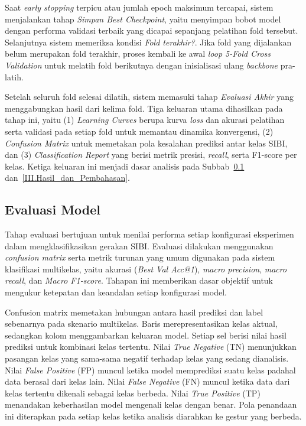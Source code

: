 Saat \textit{early stopping} terpicu atau jumlah epoch maksimum tercapai, sistem menjalankan tahap \textit{Simpan Best Checkpoint}, yaitu menyimpan bobot model dengan performa validasi terbaik yang dicapai sepanjang pelatihan fold tersebut. Selanjutnya sistem memeriksa kondisi \textit{Fold terakhir?}. Jika fold yang dijalankan belum merupakan fold terakhir, proses kembali ke awal \textit{loop 5-Fold Cross Validation} untuk melatih fold berikutnya dengan inisialisasi ulang \textit{backbone} pra-latih.

Setelah seluruh fold selesai dilatih, sistem memasuki tahap \textit{Evaluasi Akhir} yang menggabungkan hasil dari kelima fold. Tiga keluaran utama dihasilkan pada tahap ini, yaitu (1) \textit{Learning Curves} berupa kurva \textit{loss} dan akurasi pelatihan serta validasi pada setiap fold untuk memantau dinamika konvergensi, (2) \textit{Confusion Matrix} untuk memetakan pola kesalahan prediksi antar kelas SIBI, dan (3) \textit{Classification Report} yang berisi metrik presisi, \textit{recall}, serta F1-score per kelas. Ketiga keluaran ini menjadi dasar analisis pada Subbab~\ref{III.Evaluasi_Model} dan~\ref{III.Hasil_dan_Pembahasan}.


\subsection{Evaluasi Model} \label{III.Evaluasi_Model}
\label{III.Rancang_Uji}
Tahap evaluasi bertujuan untuk menilai performa setiap konfigurasi eksperimen dalam mengklasifikasikan gerakan SIBI. Evaluasi dilakukan menggunakan \textit{confusion matrix} serta metrik turunan yang umum digunakan pada sistem klasifikasi multikelas, yaitu akurasi (\textit{Best Val Acc@1}), \textit{macro precision}, \textit{macro recall}, dan \textit{Macro F1-score}. Tahapan ini memberikan dasar objektif untuk mengukur ketepatan dan keandalan setiap konfigurasi model.\par

Confusion matrix memetakan hubungan antara hasil prediksi dan label sebenarnya pada skenario multikelas. Baris merepresentasikan kelas aktual, sedangkan kolom menggambarkan keluaran model. Setiap sel berisi nilai hasil prediksi untuk kombinasi kelas tertentu. Nilai \textit{True Negative} (TN) menunjukkan pasangan kelas yang sama-sama negatif terhadap kelas yang sedang dianalisis. Nilai \textit{False Positive} (FP) muncul ketika model memprediksi suatu kelas padahal data berasal dari kelas lain. Nilai \textit{False Negative} (FN) muncul ketika data dari kelas tertentu dikenali sebagai kelas berbeda. Nilai \textit{True Positive} (TP) menandakan keberhasilan model mengenali kelas dengan benar. Pola penandaan ini diterapkan pada setiap kelas ketika analisis diarahkan ke gestur yang berbeda.\par

